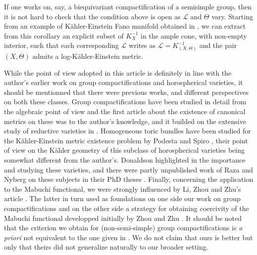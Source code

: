 \documentclass{amsart}
\theoremstyle{definition}
\begin{document}
If one works on, say, a biequivariant compactification of a 
semisimple group, then it is not hard to check that the condition 
above is open as $\mathcal{L}$ and $\Theta$ vary. 
Starting from an example of 
Kähler-Einstein Fano manifold obtained in \cite{DelKE}, 
we can extract from this corollary an explicit subset  
of $K_X^{-1}$ in the ample cone, with non-empty interior, such that each 
corresponding $\mathcal{L}$ writes as $\mathcal{L}=K_{(X,\Theta)}^{-1}$ 
and the pair $(X,\Theta)$ admits a log-Kähler-Einstein metric. 

 While the point of view adopted in this article is 
definitely in line with the author's earlier work on group 
compactifications and horospherical varieties, it should be 
mentionned that there were previous works, and different 
perspectives on both these classes. Group compactifications 
have been studied in detail from the algebraic point of view 
and the first article about the existence of 
canonical metrics on these was \cite{AK05} to the author's 
knowledge, and it builded on the extensive study of reductive 
varieties in \cite{AB04SRVI,AB04SRVII}. Homogeneous toric 
bundles have been studied for the Kähler-Einstein metric existence 
problem by Podesta and Spiro \cite{PS10}, their point of view on 
the Kähler geometry of this subclass of horospherical varieties 
being somewhat different from the author's. Donaldson highlighted 
in \cite{Don08} the importance and studying these varieties, and there 
were partly unpublished work of Raza and Nyberg on these subjects in 
their PhD theses \cite{Raz,Raz07,Nyb}. 
Finally, concerning the application to the Mabuchi functional, 
we were strongly influenced by Li, Zhou and Zhu's article \cite{LZZ}.
The latter in turn used as foundations on one side our work on group 
compactifications and on the other side a strategy for obtaining 
coercivity of the Mabuchi functional developped initially by 
Zhou and Zhu \cite{ZZ08}.
It should be noted that the criterion we obtain for (non-semi-simple) group 
compactifications is \emph{a priori} not equivalent to the one given in 
\cite{LZZ}. We do not claim 
that ours is better but only that theirs did not generalize naturally 
to our broader setting. 
\end{document}
